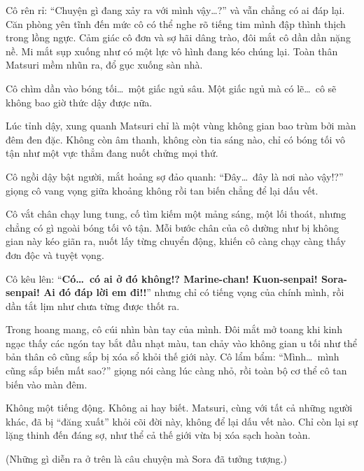 \documentclass[../main.tex]{subfiles}
\begin{document}
Cô rên rỉ: ``Chuyện gì đang xảy ra với mình vậy\dots?'' và vẫn chẳng có ai đáp lại. Căn phòng yên tĩnh đến mức cô có thể nghe rõ tiếng tim mình đập thình thịch trong lồng ngực. Cảm giác cô đơn và sợ hãi dâng trào, đôi mắt cô dần dần nặng nề. Mi mắt sụp xuống như có một lực vô hình đang kéo chúng lại. Toàn thân Matsuri mềm nhũn ra, đổ gục xuống sàn nhà.

Cô chìm dần vào bóng tối\dots\ một giấc ngủ sâu. Một giấc ngủ mà có lẽ\dots\ cô sẽ không bao giờ thức dậy được nữa.

\ct

Lúc tỉnh dậy, xung quanh Matsuri chỉ là một vùng không gian bao trùm bởi màn đêm đen đặc. Không còn âm thanh, không còn tia sáng nào, chỉ có bóng tối vô tận như một vực thẳm đang nuốt chửng mọi thứ.


Cô ngồi dậy bật người, mắt hoảng sợ đảo quanh: ``Đây\dots\ đây là nơi nào vậy!?'' giọng cô vang vọng giữa khoảng không rồi tan biến chẳng để lại dấu vết.

Cô vắt chân chạy lung tung, cố tìm kiếm một mảng sáng, một lối thoát, nhưng chẳng có gì ngoài bóng tối vô tận. Mỗi bước chân của cô dường như bị không gian này kéo giãn ra, nuốt lấy từng chuyển động, khiến cô càng chạy càng thấy đơn độc và tuyệt vọng.

Cô kêu lên: ``\textbf{Có\dots\ có ai ở đó không!? Marine-chan! Kuon-senpai! Sora-senpai! Ai đó đáp lời em đi!!}'' nhưng chỉ có tiếng vọng của chính mình, rồi dần tắt lịm như chưa từng được thốt ra.

Trong hoang mang, cô cúi nhìn bàn tay của mình. Đôi mắt mở toang khi kinh ngạc thấy các ngón tay bắt đầu nhạt màu, tan chảy vào không gian u tối như thể bản thân cô cũng sắp bị xóa sổ khỏi thế giới này. Cô lẩm bẩm: ``Mình\dots\ mình cũng sắp biến mất sao?'' giọng nói càng lúc càng nhỏ, rồi toàn bộ cơ thể cô tan biến vào màn đêm.

Không một tiếng động. Không ai hay biết. Matsuri, cùng với tất cả những người khác, đã bị ``đăng xuất'' khỏi cõi đời này, không để lại dấu vết nào. Chỉ còn lại sự lặng thinh đến đáng sợ, như thể cả thế giới vừa bị xóa sạch hoàn toàn.

\omk

\begin{center}
  (Những gì diễn ra ở trên là câu chuyện mà Sora đã tưởng tượng.)
\end{center}
\end{document}
